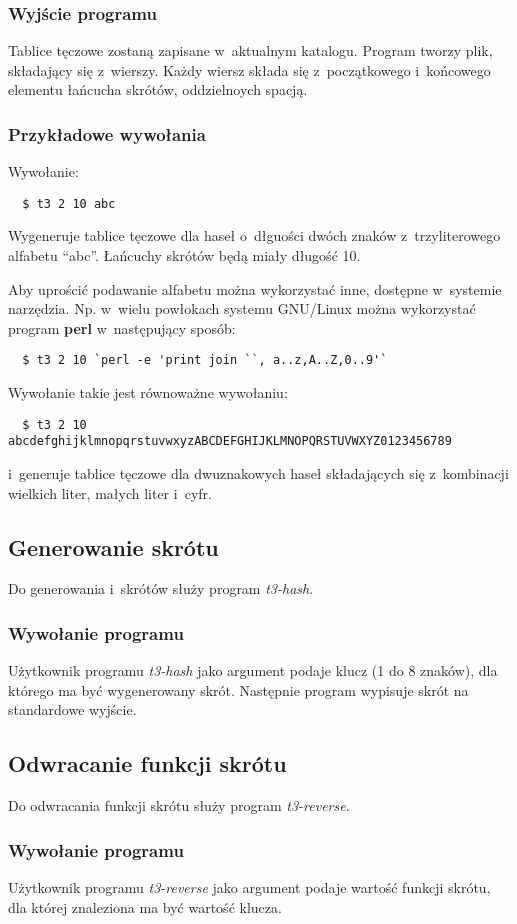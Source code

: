 \documentclass[a4paper]{scrartcl}
\begin{document}
\subsubsection{Wyjście programu}
Tablice tęczowe zostaną zapisane w~aktualnym katalogu.
Program tworzy plik, składający się z~wierszy. Każdy wiersz składa się z~początkowego i~końcowego elementu łańcucha skrótów, oddzielnoych spacją.

\subsubsection{Przykładowe wywołania}
Wywołanie:
\begin{lstlisting}
  $ t3 2 10 abc
\end{lstlisting}
Wygeneruje tablice tęczowe dla haseł o~dłguości dwóch znaków z~trzyliterowego alfabetu ``abc''. Łańcuchy skrótów będą miały długość 10.

Aby uprościć podawanie alfabetu można wykorzystać inne, dostępne w~systemie narzędzia. Np. w~wielu powłokach systemu GNU/Linux można wykorzystać program \textbf{perl} w~następujący sposób:
\begin{lstlisting}
  $ t3 2 10 `perl -e 'print join ``, a..z,A..Z,0..9'`
\end{lstlisting}
Wywołanie takie jest równoważne wywołaniu:
\begin{lstlisting}
  $ t3 2 10 abcdefghijklmnopqrstuvwxyzABCDEFGHIJKLMNOPQRSTUVWXYZ0123456789
\end{lstlisting}
i~generuje tablice tęczowe dla dwuznakowych haseł składających się z~kombinacji wielkich liter, małych liter i~cyfr.
\subsection{Generowanie skrótu}
Do generowania i~skrótów służy program \emph{t3-hash}.
\subsubsection{Wywołanie programu}
Użytkownik programu \emph{t3-hash} jako argument podaje klucz (1 do 8 znaków), dla którego ma być wygenerowany skrót.
Następnie program wypisuje skrót na standardowe wyjście.


\subsection{Odwracanie funkcji skrótu}
Do odwracania funkcji skrótu służy program \emph{t3-reverse}.
\subsubsection{Wywołanie programu}
Użytkownik programu \emph{t3-reverse} jako argument podaje wartość funkcji skrótu, dla której znaleziona ma być wartość klucza.
\end{document}
